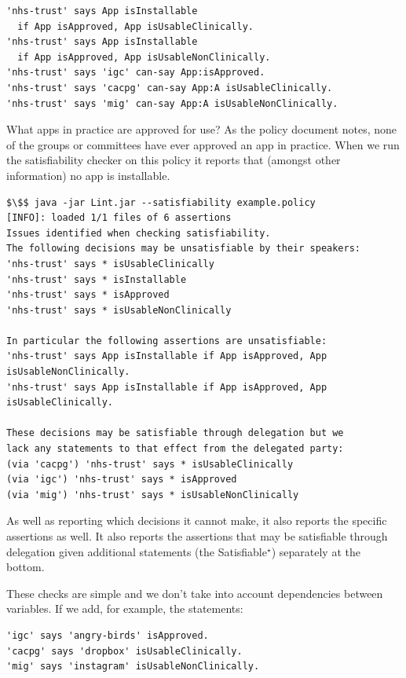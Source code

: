 \documentclass[thesis.tex]{subfiles}
\begin{document}
\begin{lstlisting}
'nhs-trust' says App isInstallable
  if App isApproved, App isUsableClinically.
'nhs-trust' says App isInstallable
  if App isApproved, App isUsableNonClinically.
'nhs-trust' says 'igc' can-say App:isApproved.
'nhs-trust' says 'cacpg' can-say App:A isUsableClinically.
'nhs-trust' says 'mig' can-say App:A isUsableNonClinically.
\end{lstlisting}

What apps in practice are approved for use?
As the policy document notes, none of the groups or committees have ever
approved an app in practice.
When we run the satisfiability checker on this policy
it reports that (amongst other information) no app is installable.

\begin{lstlisting}
$\$$ java -jar Lint.jar --satisfiability example.policy
[INFO]: loaded 1/1 files of 6 assertions
Issues identified when checking satisfiability.
The following decisions may be unsatisfiable by their speakers:
'nhs-trust' says * isUsableClinically
'nhs-trust' says * isInstallable
'nhs-trust' says * isApproved
'nhs-trust' says * isUsableNonClinically

In particular the following assertions are unsatisfiable:
'nhs-trust' says App isInstallable if App isApproved, App isUsableNonClinically.
'nhs-trust' says App isInstallable if App isApproved, App isUsableClinically.

These decisions may be satisfiable through delegation but we
lack any statements to that effect from the delegated party:
(via 'cacpg') 'nhs-trust' says * isUsableClinically
(via 'igc') 'nhs-trust' says * isApproved
(via 'mig') 'nhs-trust' says * isUsableNonClinically
\end{lstlisting}

As well as reporting which decisions it cannot make, it also reports the
specific assertions as well. It also reports the assertions that may be
satisfiable through delegation given additional statements (the
Satisfiable$^\star$) separately at the bottom.

These checks are simple and we don't take into
account dependencies between variables. If we add, for example, the statements:

\begin{lstlisting}
'igc' says 'angry-birds' isApproved.
'cacpg' says 'dropbox' isUsableClinically.
'mig' says 'instagram' isUsableNonClinically.
\end{lstlisting}
\end{document}
